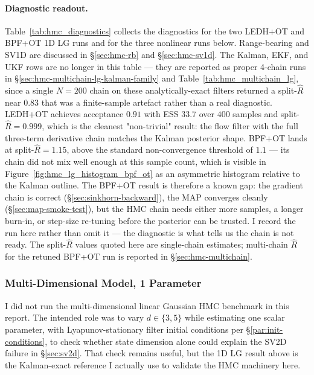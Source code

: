 \documentclass{article}
\begin{document}
\paragraph{Diagnostic readout.}
Table~\ref{tab:hmc_diagnostics} collects the diagnostics for the two LEDH+OT and BPF+OT 1D LG runs and for the three nonlinear runs below. Range-bearing and SV1D are discussed in \S\ref{sec:hmc-rb} and \S\ref{sec:hmc-sv1d}. The Kalman, EKF, and UKF rows are no longer in this table --- they are reported as proper 4-chain runs in \S\ref{sec:hmc-multichain-lg-kalman-family} and Table~\ref{tab:hmc_multichain_lg}, since a single $N=200$ chain on these analytically-exact filters returned a split-$\hat R$ near $0.83$ that was a finite-sample artefact rather than a real diagnostic. LEDH+OT achieves acceptance $0.91$ with ESS $33.7$ over $400$ samples and split-$\hat R = 0.999$, which is the cleanest "non-trivial" result: the flow filter with the full three-term derivative chain matches the Kalman posterior shape. BPF+OT lands at split-$\hat R = 1.15$, above the standard non-convergence threshold of $1.1$ --- its chain did not mix well enough at this sample count, which is visible in Figure~\ref{fig:hmc_lg_histogram_bpf_ot} as an asymmetric histogram relative to the Kalman outline. The BPF+OT result is therefore a known gap: the gradient chain is correct (§\ref{sec:sinkhorn-backward}), the MAP converges cleanly (§\ref{sec:map-smoke-test}), but the HMC chain needs either more samples, a longer burn-in, or step-size re-tuning before the posterior can be trusted. I record the run here rather than omit it --- the diagnostic is what tells us the chain is not ready. The split-$\hat R$ values quoted here are single-chain estimates; multi-chain $\hat R$ for the retuned BPF+OT run is reported in \S\ref{sec:hmc-multichain}.
\fi

\subsubsection{Multi-Dimensional Model, 1 Parameter}
\label{sec:multi-d-lg}
I did not run the multi-dimensional linear Gaussian HMC benchmark in this report. The intended role was to vary $d \in \{3,5\}$ while estimating one scalar parameter, with Lyapunov-stationary filter initial conditions per \S\ref{par:init-conditions}, to check whether state dimension alone could explain the SV2D failure in \S\ref{sec:sv2d}. That check remains useful, but the 1D LG result above is the Kalman-exact reference I actually use to validate the HMC machinery here.
\end{document}
